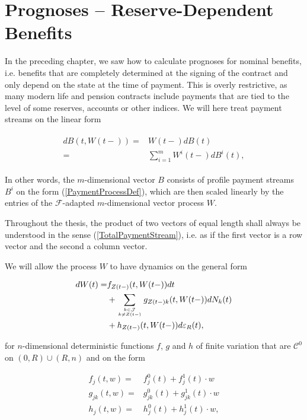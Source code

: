 \documentclass{article}
\newcommand{\1}[1]{\mathbbm{1}_{\left\lbrace #1 \right\rbrace}}
\theoremstyle{break}
\theoremstyle{remark}
\newenvironment{remark}
  {\pushQED{\qed}\renewcommand{\qedsymbol}{\scalebox{1.4}{$\circ$}}\remarkx}
  {\popQED\endremarkx}
\numberwithin{equation}{section}
\begin{document}
\newpage
\section{Prognoses -- Reserve-Dependent Benefits} \label{ChapReserveDepBen}

In the preceding chapter, we saw how to calculate prognoses for nominal benefits, i.e. benefits that are completely determined at the signing of the contract and only depend on the state at the time of payment. This is overly restrictive, as many modern life and pension contracts include payments that are tied to the level of some reserves, accounts or other indices. We will here treat payment streams on the linear form

\begin{align} \label{TotalPaymentStream}
\begin{split}
	dB(t,W(t-)) =& W(t-) dB(t) \\
=& \sum_{i=1}^{m} W^i(t-) dB^i(t),
\end{split}
\end{align}

In other words, the $m$-dimensional vector $B$ consists of profile payment streams $B^i$ on the form (\ref{PaymentProcessDef}), which are then scaled linearly by the entries of the $\mathcal{F}$-adapted $m$-dimensional vector process $W$.

\begin{remark}
	Throughout the thesis, the product of two vectors of equal length shall always be understood in the sense (\ref{TotalPaymentStream}), i.e. as if the first vector is a row vector and the second a column vector.
\end{remark}

We will allow the process $W$ to have dynamics on the general form

\begin{align} \label{WDynamicsStart}
	\begin{split}
		dW(t) =& f_{Z(t-)}(t,W(t-)) dt \\
		&+ \sum_{k \in \mathcal{J} \atop k \neq Z(t-)} g_{Z(t-)k}(t,W(t-)) dN_{k}(t) \\
		&+ h_{Z(t-)}(t,W(t-)) d \varepsilon_R(t),
	\end{split}
\end{align}

for $n$-dimensional deterministic functions $f$, $g$ and $h$ of finite variation that are $\mathcal{C}^0$ on $(0,R) \cup (R,n)$ and on the form

\begin{align*}
	f_j(t,w) =& f_j^0(t) + f_j^1(t) \cdot w \\
	g_{jk}(t,w) =& g_{jk}^0(t) + g_{jk}^1(t) \cdot w \\
	h_j(t,w) =& h_j^0(t) + h_j^1(t) \cdot w,
\end{align*}
\end{document}
